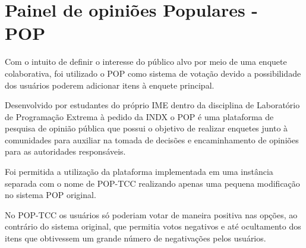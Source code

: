 \section{Painel de opiniões Populares - POP}
\par Com o intuito de definir o interesse do público alvo por meio de uma enquete colaborativa, foi utilizado o POP como sistema de votação devido a possibilidade dos usuários poderem adicionar itens à enquete principal.
\par Desenvolvido por estudantes do próprio IME dentro da disciplina de Laboratório de Programação Extrema à pedido da INDX o POP é uma plataforma de pesquisa de opinião pública que possui o objetivo de realizar enquetes junto à comunidades para auxiliar na tomada de decisões e encaminhamento de opiniões para as autoridades responsáveis.
\par Foi permitida a utilização da plataforma implementada em uma instância separada com o nome de POP-TCC realizando apenas uma pequena modificação no sistema POP original.
\par No POP-TCC os usuários só poderiam votar de maneira positiva nas opções, ao contrário do sistema original, que permitia votos negativos e até ocultamento dos itens que obtivessem um grande número de negativações pelos usuários.

